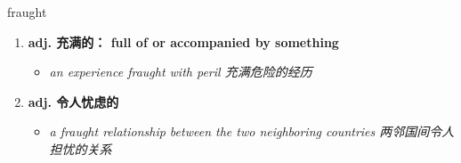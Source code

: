 
\begin{frame}
{\huge fraught}
\begin{center}
\begin{enumerate}\Large
  \item \textbf{adj. 充满的： full of or accompanied by something}
  \begin{itemize}
    \item \em{\Large{an experience fraught with peril 充满危险的经历}}
  \end{itemize}
  \item \textbf{adj. 令人忧虑的}
  \begin{itemize}
    \item \em{\Large{a fraught relationship between the two neighboring countries 两邻国间令人担忧的关系}}
  \end{itemize}
\end{enumerate}
\end{center}
\end{frame}
